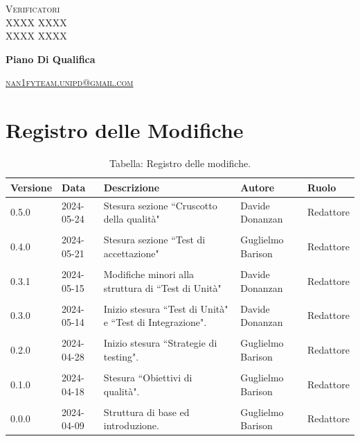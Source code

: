 \documentclass[8pt]{article}
\begin{document}
\begin{titlepage}
\begin{minipage}[t]{0.47\textwidth}
		{\large{\textsc{Verificatori}}
			\vspace{3mm}
			{\\\large{\textsc{XXXX XXXX}\\}} 
			{\large{\textsc{XXXX XXXX}}}
			
		}
		\vspace{4mm}\vspace{4mm}
	\end{minipage}
	\vspace{4cm}
	\begin{center}
		\begin{flushright}
			{\fontsize{30pt}{52pt}\selectfont \textbf{Piano Di Qualifica}} %
		\end{flushright}
		\vspace{3cm}
	\end{center}
	\vspace{10 cm}
	{\small \textsc{\href{mailto: nan1fyteam.unipd@gmail.com}{nan1fyteam.unipd@gmail.com}}}
\end{titlepage}
\pagestyle{mystyle}
\section*{Registro delle Modifiche}
\begin{table}[ht!]	
	\centering
	\begin{tabular}{p{1.2cm} p{2cm} p{6cm} p{3cm} p{2cm}}
		\toprule
		\textbf{Versione}& \textbf{Data} & \textbf{Descrizione} & \textbf{Autore} & \textbf{Ruolo} \\
		\midrule	
        0.5.0 & 2024-05-24 & Stesura sezione ``Cruscotto della qualità" & Davide Donanzan & Redattore \\\\
        0.4.0 & 2024-05-21 & Stesura sezione ``Test di accettazione" & Guglielmo Barison & Redattore \\\\
        0.3.1 & 2024-05-15 & Modifiche minori alla struttura di ``Test di Unità" & Davide Donanzan & Redattore \\\\
		0.3.0 & 2024-05-14 & Inizio stesura ``Test di Unità" e ``Test di Integrazione". & Davide Donanzan & Redattore \\\\
		0.2.0 & 2024-04-28 & Inizio stesura ``Strategie di testing". & Guglielmo Barison & Redattore \\\\
		0.1.0 & 2024-04-18 & Stesura ``Obiettivi di qualità". & Guglielmo Barison & Redattore \\\\
		0.0.0 & 2024-04-09 & Struttura di base ed introduzione.  & Guglielmo Barison & Redattore \\
		\bottomrule
	\end{tabular}
	\caption*{Tabella: Registro delle modifiche.}
	\label{table:Registro delle modifiche}
\end{table}
\newpage
\tableofcontents
\newpage
\listoffigures
\newpage
\listoftables
\newpage
\justifying
\end{document}
